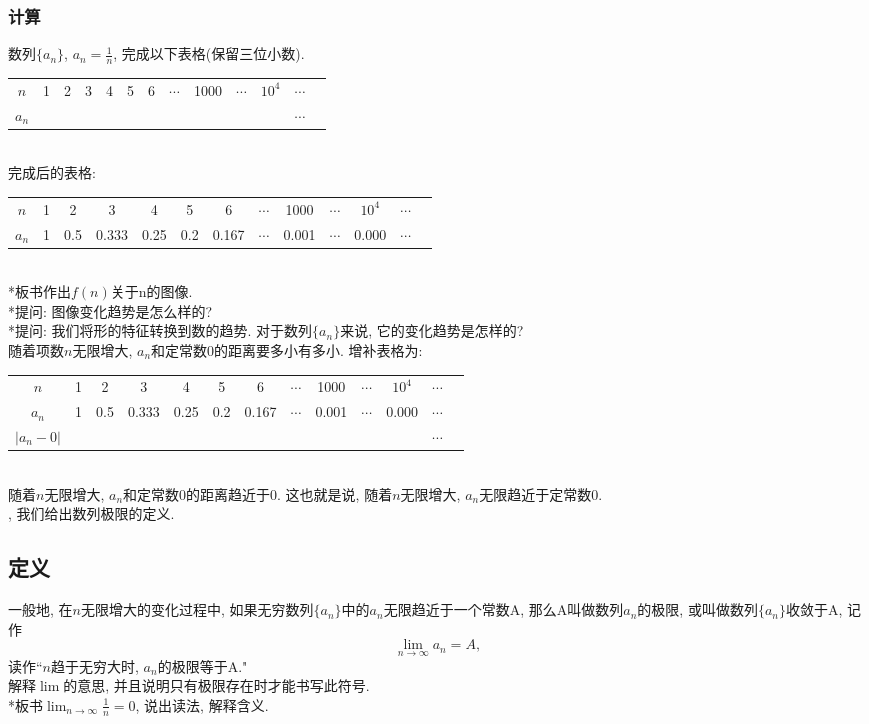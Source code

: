\documentclass{article}
\begin{document}
\begin{CJK}{UTF8}{gkai}
\subsubsection{计算}
数列$\{a_n\}$, $a_n = \frac{1}{n}$, 完成以下表格(保留三位小数). \\
\begin{tabular}{| c || c | c | c | c | c | c | c | c | c | c | c | c |}
  $n$     & 1 & 2 & 3 & 4 & 5 & 6 & $\cdots$ & 1000 & $\cdots$ & $10^4$ & $\cdots$\\
  $a_n$ &&&&&&&&&&&$\cdots$\\  
\end{tabular}\\
完成后的表格: \\
\begin{tabular}{| c || c | c | c | c | c | c | c | c | c | c | c | c |}
  $n$     & 1 & 2 & 3 & 4 & 5 & 6 & $\cdots$ & 1000 & $\cdots$ & $10^4$ & $\cdots$\\
  $a_n$ & 1 & 0.5 & 0.333 & 0.25 & 0.2 & 0.167 & $\cdots$ & 0.001 & $\cdots$ & 0.000 & $\cdots$\\  
\end{tabular}\\
*板书作出$f(n)$关于n的图像.\\
*提问: 图像变化趋势是怎么样的?\\
*提问: 我们将形的特征转换到数的趋势. 对于数列$\{a_n\}$来说, 它的变化趋势是怎样的?\\
随着项数$n$无限增大, $a_n$和定常数0的距离要多小有多小. 增补表格为: \\
\begin{tabular}{| c || c | c | c | c | c | c | c | c | c | c | c | c |}
  $n$     & 1 & 2 & 3 & 4 & 5 & 6 & $\cdots$ & 1000 & $\cdots$ & $10^4$ & $\cdots$\\
  $a_n$ & 1 & 0.5 & 0.333 & 0.25 & 0.2 & 0.167 & $\cdots$ & 0.001 & $\cdots$ & 0.000 & $\cdots$\\  
  $| a_n - 0 |$ &&&&&&&&&&&$\cdots$
\end{tabular}\\
随着$n$无限增大, $a_n$和定常数0的距离趋近于0. 这也就是说, 随着$n$无限增大, $a_n$无限趋近于定常数0.\\
, 我们给出数列极限的定义.\\

\subsection{定义}
一般地, 在$n$无限增大的变化过程中, 如果无穷数列$\{a_n\}$中的$a_n$无限趋近于一个常数A,  那么A叫做数列${a_n}$的极限, 或叫做数列$\{a_n\}$收敛于A, 记作$$\lim_{n \to \infty}{a_n} = A,$$
读作``$n$趋于无穷大时, $a_n$的极限等于A."\\
解释$\lim$的意思, 并且说明只有极限存在时才能书写此符号.\\
*板书$\lim_{n \to \infty}{\frac{1}{n}} = 0$, 说出读法, 解释含义.\\


\end{CJK}
\end{document}
